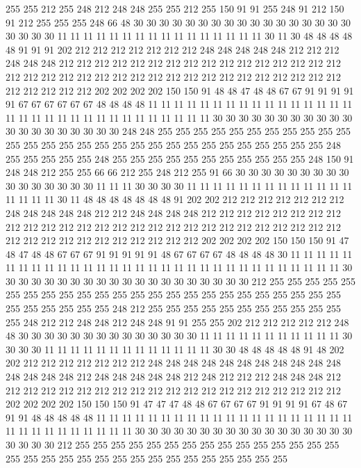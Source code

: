255 255 212 255 248 212 248 248 255 255 212 255 150 91 91 255 248 91 212 150
91 212 255 255 255 248 66 48 30 30 30 30 30 30 30 30 30 30 30 30
30 30 30 30 30 30 30 30 30 11 11 11 11 11 11 11 11 11 11 11
11 11 11 11 11 30 11 30 48 48 48 48 48 91 91 91 202 212 212 212
212 212 212 212 248 248 248 248 248 212 212 212 248 248 248 212 212 212 212 212
212 212 212 212 212 212 212 212 212 212 212 212 212 212 212 212 212 212 212 212
212 212 212 212 212 212 212 212 212 212 212 212 212 212 212 202 202 202 202 150
150 91 48 48 47 48 48 67 67 91 91 91 91 91 67 67 67 67 67 67
48 48 48 48 11 11 11 11 11 11 11 11 11 11 11 11 11 11 11 11
11 11 11 11 11 11 11 11 11 11 11 11 11 11 11 11 30 30 30 30
30 30 30 30 30 30 30 30 30 30 30 30 30 30 30 30 248 248 255 255
255 255 255 255 255 255 255 255 255 255 255 255 255 255 255 255 255 255 255 255
255 255 255 255 255 255 255 248 255 255 255 255 255 248 255 255 255 255 255 255
255 255 255 255 255 248 150 91 248 248 212 255 255 66 66 212 255 248 212 255
91 66 30 30 30 30 30 30 30 30 30 30 30 30 30 30 30 30 11 11
11 30 30 30 30 11 11 11 11 11 11 11 11 11 11 11 11 11 11 11
11 11 30 11 48 48 48 48 48 48 48 91 202 202 212 212 212 212 212 212
212 248 248 248 248 248 212 212 248 248 248 248 212 212 212 212 212 212 212 212
212 212 212 212 212 212 212 212 212 212 212 212 212 212 212 212 212 212 212 212
212 212 212 212 212 212 212 212 212 212 202 202 202 202 150 150 150 91 47 48
47 48 48 67 67 67 91 91 91 91 91 48 67 67 67 67 48 48 48 48
30 11 11 11 11 11 11 11 11 11 11 11 11 11 11 11 11 11 11 11
11 11 11 11 11 11 11 11 11 11 11 11 30 30 30 30 30 30 30 30
30 30 30 30 30 30 30 30 30 30 30 30 212 255 255 255 255 255 255 255
255 255 255 255 255 255 255 255 255 255 255 255 255 255 255 255 255 255 255 255
255 255 255 248 212 255 255 255 255 255 255 255 255 255 255 255 255 248 212 212
248 248 212 248 248 91 91 255 255 202 212 212 212 212 212 248 48 30 30 30
30 30 30 30 30 30 30 30 30 30 30 11 11 11 11 11 11 11 11 11
11 11 30 30 30 30 11 11 11 11 11 11 11 11 11 11 11 11 11 30
30 48 48 48 48 48 91 48 202 202 212 212 212 212 212 212 212 248 248 248
248 248 248 248 248 248 248 248 248 248 248 248 212 248 248 248 248 248 212 248
212 212 212 248 248 248 212 212 212 212 212 212 212 212 212 212 212 212 212 212
212 212 212 212 212 212 202 202 202 202 150 150 150 91 47 47 47 48 48 67
67 67 67 91 91 91 91 67 48 67 91 91 48 48 48 48 48 11 11 11
11 11 11 11 11 11 11 11 11 11 11 11 11 11 11 11 11 11 11 11
11 11 11 11 11 11 11 30 30 30 30 30 30 30 30 30 30 30 30 30
30 30 30 30 30 30 30 30 212 255 255 255 255 255 255 255 255 255 255 255
255 255 255 255 255 255 255 255 255 255 255 255 255 255 255 255 255 255 255 255
